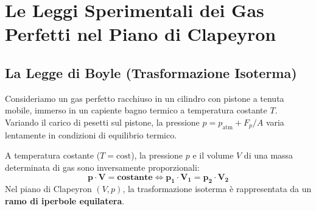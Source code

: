 \documentclass[11pt,a4paper,oneside]{report}
\begin{document}
\chapter{Le Leggi Sperimentali dei Gas Perfetti nel Piano di Clapeyron}

\section{La Legge di Boyle (Trasformazione Isoterma)}

Consideriamo un gas perfetto racchiuso in un cilindro con pistone a tenuta mobile, immerso in un capiente bagno termico a temperatura costante $T$. Variando il carico di pesetti sul pistone, la pressione $p = p_{\text{atm}} + F_p / A$ varia lentamente in condizioni di equilibrio termico.

\begin{leggefisica}
A temperatura costante ($T = \text{cost}$), la pressione $p$ e il volume $V$ di una massa determinata di gas sono inversamente proporzionali:
\[
\mathbf{p \cdot V = \text{costante}} \iff \mathbf{p_1 \cdot V_1 = p_2 \cdot V_2}
\]
Nel piano di Clapeyron $(V, p)$, la trasformazione isoterma \`e rappresentata da un \textbf{ramo di iperbole equilatera}.
\end{leggefisica}
\end{document}
